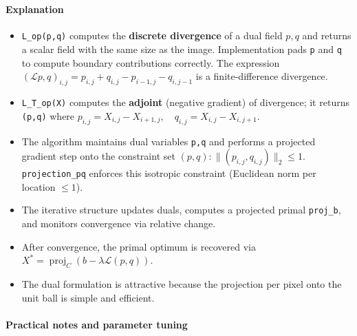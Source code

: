 \documentclass[11pt]{article}
\begin{document}
    \begin{center}
    \end{center}
    { \hspace*{\fill} \\}
    
    \hypertarget{explanation}{%
\paragraph{\texorpdfstring{\textbf{Explanation}}{Explanation}}\label{explanation}}

\begin{itemize}
\item
  \texttt{L\_op(p,q)} computes the \textbf{discrete divergence} of a
  dual field \(p,q\) and returns a scalar field with the same size as
  the image. Implementation pads \texttt{p} and \texttt{q} to compute
  boundary contributions correctly. The expression
  \((\mathcal{L}p,q)_{i,j} = p_{i,j} + q_{i,j} - p_{i-1,j} - q_{i,j-1}\)
  is a finite-difference divergence.
\item
  \texttt{L\_T\_op(X)} computes the \textbf{adjoint} (negative gradient)
  of divergence; it returns \texttt{(p,q)} where
  \(p_{i,j} = X_{i,j} - X_{i+1,j},\quad q_{i,j} = X_{i,j} - X_{i,j+1}\).
\item
  The algorithm maintains dual variables \texttt{p,q} and performs a
  projected gradient step onto the constraint set
  \({(p,q): \| (p_{i,j},q_{i,j})\|_2 \le 1}\). \texttt{projection\_pq}
  enforces this isotropic constraint (Euclidean norm per location
  \(≤ 1\)).
\item
  The iterative structure updates duals, computes a projected primal
  \texttt{proj\_b}, and monitors convergence via relative change.
\item
  After convergence, the primal optimum is recovered via
  \(X^\ast = \operatorname{proj}_C(b - \lambda \mathcal{L}(p,q))\).
\item
  The dual formulation is attractive because the projection per pixel
  onto the unit ball is simple and efficient.
\end{itemize}

\hypertarget{practical-notes-and-parameter-tuning}{%
\paragraph{\texorpdfstring{\textbf{Practical notes and parameter
tuning}}{Practical notes and parameter tuning}}\label{practical-notes-and-parameter-tuning}}
\end{document}
